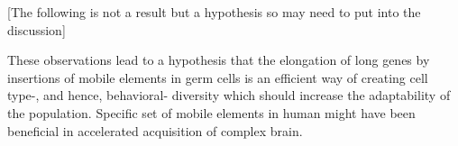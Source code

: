 [The following is not a result but a hypothesis so may need to put into the discussion]

These observations lead to a hypothesis that the elongation of long genes by insertions of mobile elements in germ cells is an efficient way of creating cell type-, and hence, behavioral- diversity which should increase the adaptability of the population. Specific set of mobile elements in human might have been beneficial in accelerated acquisition of complex brain.
